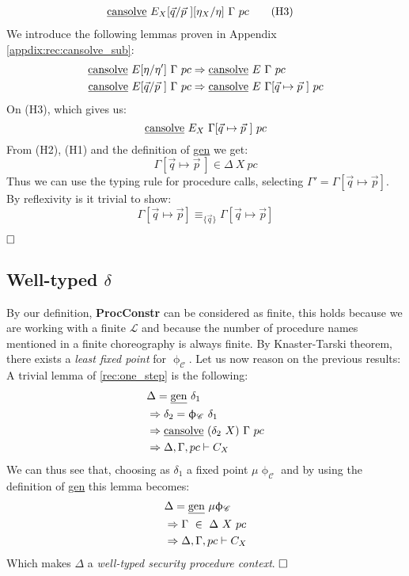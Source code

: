\documentclass[12pt,a4paper,twoside]{book}
\newcommand{\MCL}{\mathscr{L}}
\newcommand{\qed}{\hfill\square}
\begin{document}
\begin{itemize}
\begin{align*}
	&\text{\underline{cansolve}}~E_X[\vec{q}/\vec{p}~][\eta_X/\eta]~\Gamma~pc\tag{H3}
\end{align*}
We introduce the following lemmas proven in Appendix \ref{appdix:rec:cansolve_sub}:
\begin{align*}
\text{\underline{cansolve}}~E[\eta/\eta']~\Gamma~pc
&\Rightarrow \text{\underline{cansolve}}~E~\Gamma~pc\\
\text{\underline{cansolve}}~E[\vec{q}/\vec{p}~]~\Gamma~pc
&\Rightarrow \text{\underline{cansolve}}~E~\Gamma[\vec{q}\mapsto\vec{p}~]~pc
\end{align*}
On (H3), which gives us:
$$
\text{\underline{cansolve}}~E_X~\Gamma[\vec{q}\mapsto\vec{p}~]~pc
$$
From (H2), (H1) and the definition of \underline{gen} we get:
$$
\Gamma[\vec{q}\mapsto\vec{p}~] \in \Delta~X~pc
$$
Thus we can use the typing rule for procedure calls, selecting $\Gamma' = \Gamma[\vec{q}\mapsto\vec{p}]$. By reflexivity is it trivial to show:
$$
\Gamma[\vec{q}\mapsto\vec{p}] \equiv_{\{\vec{q}\}} 
\Gamma[\vec{q}\mapsto\vec{p}]
$$
\end{itemize}
$\qed$
\subsection{Well-typed $\delta$}
By our definition, \textbf{ProcConstr} can be considered as finite, this holds because we are working with a finite $\MCL$ and because the number of procedure names mentioned in a finite choreography is always finite.
By Knaster-Tarski theorem\cite{tarski1955lattice}, there exists a \emph{least fixed point} for $\upphi_\mathscr{C}$. Let us now reason on the previous results:\\
A trivial lemma of \ref{rec:one_step} is the following:
\begin{align*}
&\Delta = \text{\underline{gen}}~\delta_1\\
&\Rightarrow \delta_2 = \upphi_\mathscr{C}~\delta_1\\
&\Rightarrow \text{\underline{cansolve}}~(\delta_2~X)~\Gamma~pc\\
&\Rightarrow \Delta,\Gamma,pc \vdash C_X
\end{align*}
We can thus see that, choosing as $\delta_1$ a fixed point $\mu\upphi_\mathscr{C}$ and by using the definition of \underline{gen} this lemma becomes:
\begin{align*}
&\Delta = \text{\underline{gen}}~\mu\upphi_\mathscr{C}\\
&\Rightarrow \Gamma~\in~\Delta~X~pc\\
&\Rightarrow \Delta,\Gamma,pc \vdash C_X
\end{align*}
Which makes $\Delta$ a \emph{well-typed security procedure context}. $\qed$
\end{document}
